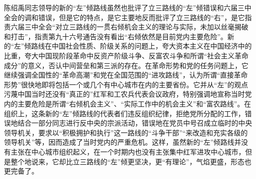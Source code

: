 陈绍禹同志领导的新的“左”倾路线虽然也批评了立三路线的“左”倾错误和六届三中全会的调和错误，但是它的特点，是它主要地反而批评了立三路线的“右”，是它指责六届三中全会“对立三路线的一贯右倾机会主义的理论与实际，未加以丝毫揭破和打击”，指责第九十六号通告没有看出“右倾依然是目前党内主要危险”。新的“左”倾路线在中国社会性质、阶级关系的问题上，夸大资本主义在中国经济中的比重，夸大中国现阶段革命中反资产阶级斗争、反富农斗争和所谓“社会主义革命成分”的意义，否认中间营垒和第三派的存在。在革命形势和党的任务问题上，它继续强调全国性的“革命高潮”和党在全国范围的“进攻路线”，认为所谓“直接革命形势”很快地即将包括一个或几个有中心城市在内的主要省份。它并从“左”的观点污蔑中国当时还没有“真正的”红军和工农兵代表会议政府，特别强调地宣称当时党内的主要危险是所谓“右倾机会主义”、“实际工作中的机会主义”和“富农路线”。在组织上，这条新的“左”倾路线的代表者们违反组织纪律，拒绝党所分配的工作，错误地结合一部分同志进行反中央的宗派活动，错误地在党员中号召成立临时的中央领导机关，要求以“积极拥护和执行”这一路线的“斗争干部”“来改造和充实各级的领导机关”等，因而造成了当时党内的严重危机。这样，虽然新的“左”倾路线并没有主张在中心城市组织起义，在一个时期内也没有主张集中红军进攻中心城市，但是整个地说来，它却比立三路线的“左”倾更坚决，更“有理论”，气焰更盛，形态也更完备了。

